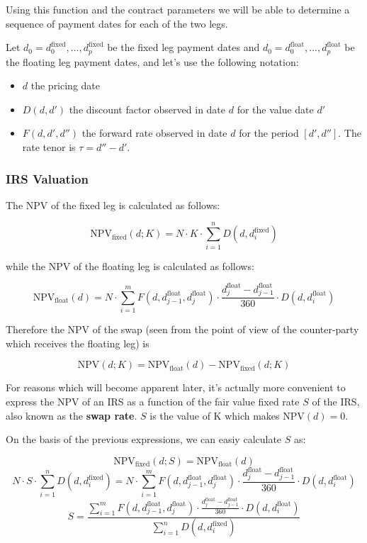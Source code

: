 \documentclass[11pt]{article}
\providecommand{\tightlist}{%
      \setlength{\itemsep}{0pt}\setlength{\parskip}{0pt}}
\begin{document}
    Using this function and the contract parameters we will be able to
determine a sequence of payment dates for each of the two legs.

    Let \(d_0=d_0^{\mathrm{fixed}},...,d_p^{\mathrm{fixed}}\) be the fixed
leg payment dates and
\(d_0=d_0^{\mathrm{float}},...,d_p^{\mathrm{float}}\) be the floating
leg payment dates, and let's use the following notation:

\begin{itemize}
\tightlist
\item
  \(d\) the pricing date
\item
  \(D(d, d')\) the discount factor observed in date \(d\) for the value
  date \(d'\)
\item
  \(F(d, d', d'')\) the forward rate observed in date \(d\) for the
  period \([d', d'']\). The rate tenor is \(\tau = d'' - d'\).
\end{itemize}

    \hypertarget{irs-valuation}{%
\subsubsection{IRS Valuation}\label{irs-valuation}}

The NPV of the fixed leg is calculated as follows:

\[\mathrm{NPV}_{\mathrm{fixed}}(d; K) = N\cdot K\cdot\sum_{i=1}^{n}D(d, d_{i}^{\mathrm{fixed}})\]

while the NPV of the floating leg is calculated as follows:

\[\mathrm{NPV}_{\mathrm{float}}(d) = N\cdot\sum_{i=1}^{m}F(d, d_{j-1}^{\mathrm{float}}, d_{j}^{\mathrm{float}}) \cdot \frac{d_{j}^{\mathrm{float}}-d_{j-1}^{\mathrm{float}}}{360}
\cdot D(d, d_{i}^{\mathrm{float}})\]

Therefore the NPV of the swap (seen from the point of view of the
counter-party which receives the floating leg) is

\[\mathrm{NPV}(d; K) = \mathrm{NPV}_{\mathrm{float}}(d) - \mathrm{NPV}_{\mathrm{fixed}}(d;K)\]

    For reasons which will become apparent later, it's actually more
convenient to express the NPV of an IRS as a function of the fair value
fixed rate \(S\) of the IRS, also known as the \textbf{swap rate}. \(S\)
is the value of K which makes \(\mathrm{NPV}(d)=0\).

On the basis of the previous expressions, we can easiy calculate \(S\)
as:

\[\mathrm{NPV}_{\mathrm{fixed}}(d;S) = \mathrm{NPV}_{\mathrm{float}}(d)\]
\[N\cdot S\cdot\sum_{i=1}^{n}D(d, d_{i}^{\mathrm{fixed}}) = N\cdot\sum_{i=1}^{m}F(d, d_{j-1}^{\mathrm{float}}, d_{j}^{\mathrm{float}}) \cdot \frac{d_{j}^{\mathrm{float}}-d_{j-1}^{\mathrm{float}}}{360} \cdot D(d, d_{i}^{\mathrm{float}})\]
\[S=\frac{\sum_{i=1}^{m}F(d, d_{j-1}^{\mathrm{float}}, d_{j}^{\mathrm{float}}) \cdot \frac{d_{j}^{\mathrm{float}}-d_{j-1}^{\mathrm{float}}}{360}
\cdot D(d, d_{i}^{\mathrm{float}})}{\sum_{i=1}^{n}D(d, d_i^{\mathrm{fixed}})} \]
\end{document}
